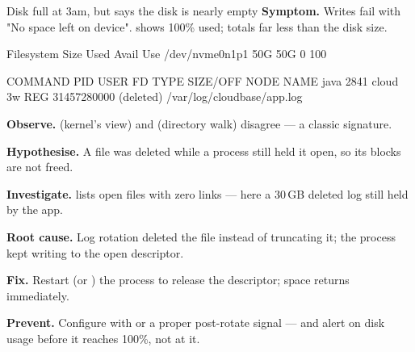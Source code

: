 \begin{debuglab}{Disk full at 3am, but  says the disk is nearly empty}
\textbf{Symptom.} Writes fail with "No space left on device".  shows 100\% used;  totals far less than the disk size.

\begin{outbox}
Filesystem      Size  Used Avail Use%
/dev/nvme0n1p1   50G   50G     0 100%

COMMAND   PID  USER   FD   TYPE  SIZE/OFF      NODE NAME
java     2841  cloud  3w   REG  31457280000  (deleted) /var/log/cloudbase/app.log
\end{outbox}

\begin{tickcheck}
  \item \textbf{Observe.}  (kernel's view) and  (directory walk) disagree --- a classic signature.
  \item \textbf{Hypothesise.} A file was deleted while a process still held it open, so its blocks are not freed.
  \item \textbf{Investigate.}  lists open files with zero links --- here a 30\,GB deleted log still held by the app.
  \item \textbf{Root cause.} Log rotation deleted the file instead of truncating it; the process kept writing to the open descriptor.
  \item \textbf{Fix.} Restart (or ) the process to release the descriptor; space returns immediately.
  \item \textbf{Prevent.} Configure  with  or a proper post-rotate signal --- and alert on disk usage before it reaches 100\%, not at it.
\end{tickcheck}
\end{debuglab}


